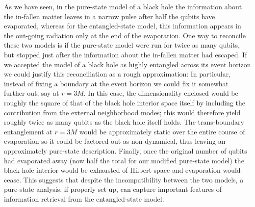 \documentclass[twocolumn,aps,prl,amsmath,amssymb,floatfix]{revtex4}
\begin{document}
As we have seen, in the pure-state model of a black hole the information
about the in-fallen matter leaves in a narrow pulse after half the qubits
have evaporated, whereas for the entangled-state model, this
information appears in the out-going radiation only at the end of
the evaporation. One way to reconcile these two models is if the
pure-state model were run for twice as many qubits, but stopped
just after the information about the in-fallen matter had escaped.
If we accepted the model of a black hole as highly entangled
across its event horizon we could justify this reconciliation as a
rough approximation: In particular, instead of fixing a boundary
at the event horizon we could fix it somewhat further out, say at
$r=3M$. In this case, the dimensionality enclosed would be roughly
the square of that of the black hole interior space itself by including
the contribution from the external neighborhood modes; this would
therefore yield roughly twice as many qubits as the black hole itself
holds. The trans-boundary entanglement at $r=3M$ would be approximately
static over the entire course of evaporation so it could be factored out
as non-dynamical, thus leaving an approximately pure-state description.
Finally, once the original number of qubits had evaporated away (now
half the total for our modified pure-state model) the black hole interior
would be exhausted of Hilbert space and evaporation would cease. This 
suggests that despite the incompatibility between the two models, a
pure-state analysis, if properly set up, can capture important features
of information retrieval from the entangled-state model.
\end{document}
